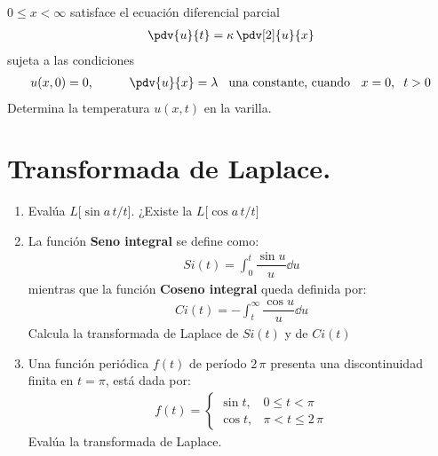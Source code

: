 \begin{enumerate}
$0 \leq x < \infty$ satisface el ecuación diferencial parcial
\begin{align*}
\pdv{u}{t} = \kappa \, \pdv[2]{u}{x}
\end{align*}
sujeta a las condiciones
\begin{align*}
u(x, 0) = 0, \hspace{1cm} \pdv{u}{x} = \lambda \hspace{0.3cm} \mbox{una constante, cuando } \hspace{0.2cm} x = 0, \hspace{0.2cm} t > 0
\end{align*}
Determina la temperatura $u(x, t)$ en la varilla.
\end{enumerate}

\section{Transformada de Laplace.}

\begin{enumerate}
\item Evalúa $L \big[\sin a \, t/ t \big]$. ¿Existe la $L \big[\cos a \, t/ t \big]$
\item La función \textbf{Seno integral} se define como:
\begin{align*}
Si(t) = \int_{0}^{t} \dfrac{\sin u }{u} \dd{u}
\end{align*}
mientras que la función \textbf{Coseno integral} queda definida por:
\begin{align*}
Ci(t) = - \int_{t}^{\infty} \dfrac{\cos u }{u} \dd{u}
\end{align*}
Calcula la transformada de Laplace de $Si(t)$ y de $Ci(t)$
\item Una función periódica $f(t)$ de período $2 \, \pi$ presenta una discontinuidad finita en $t = \pi$, está dada por:
\begin{align*}
f(t) = \begin{cases}
\sin t, & 0 \leq t < \pi \\
\cos t, & \pi < t \leq 2 \, \pi
\end{cases}
\end{align*} 
Evalúa la transformada de Laplace.

\end{enumerate}
